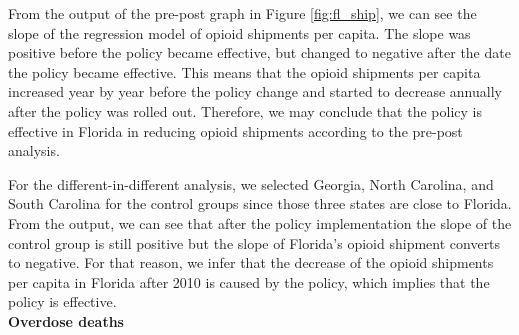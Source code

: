 \documentclass[12pt,letterpaper]{article}
\begin{document}
From the output of the pre-post graph in Figure \ref{fig:fl_ship}, we can see the slope of the regression model of opioid shipments per capita. The slope was positive before the policy became effective, but changed to negative after the date the policy became effective. This means that the opioid shipments per capita increased year by year before the policy change and started to decrease annually after the policy was rolled out. Therefore, we may conclude that the policy is effective in Florida in reducing opioid shipments according to the pre-post analysis.

For the different-in-different analysis, we selected Georgia, North Carolina, and South Carolina for the control groups since those three states are close to Florida. From the output, we can see that after the policy implementation the slope of the control group is still positive but the slope of Florida's opioid shipment converts to negative. For that reason, we infer that the decrease of the opioid shipments per capita in Florida after 2010 is caused by the policy, which implies that the policy is effective. \\

\noindent \textbf{Overdose deaths} \\
\end{document}
